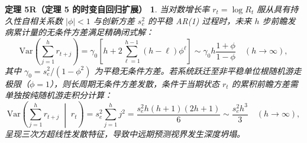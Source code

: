 \documentclass[11pt,a4paper]{article}
\theoremstyle{plain}
\newtheorem*{theorem5R}{定理 5R（定理 5 的时变自回归扩展）}
\theoremstyle{definition}
\begin{document}
\begin{theorem5R}\label{thm:t5r}
当对数增长率 $r_t = \log R_t$ 服从具有持久性自相关系数 $|\phi| < 1$ 与创新方差 $s_e^2$ 的平稳 AR(1) 过程时，未来 $h$ 步前瞻发病累计量的无条件方差满足精确闭式解：
\begin{equation}
\text{Var}\left(\sum_{j=1}^h r_{t+j}\right) = \gamma_0 \left[ h + 2 \sum_{\ell=1}^{h-1} (h-\ell) \phi^\ell \right] \sim \gamma_0 h \frac{1+\phi}{1-\phi} \quad (h \to \infty),
\end{equation}
其中 $\gamma_0 = s_e^2/(1-\phi^2)$ 为平稳无条件方差。若系统跃迁至非平稳单位根随机游走极限（$\phi = 1$），则长周期无条件方差发散，条件于当期状态 $r_t$ 的累积前瞻方差需单独按纯随机游走积分计算：
\begin{equation}
\text{Var}\left(\sum_{j=1}^h r_{t+j} \;\middle|\; r_t\right) = s_e^2 \sum_{j=1}^h j^2 = \frac{s_e^2 h(h+1)(2h+1)}{6} \sim \frac{s_e^2 h^3}{3} \quad (h \to \infty),
\end{equation}
呈现三次方超线性发散特征，导致中远期预测视界发生深度坍塌。
\end{theorem5R}
\end{document}
